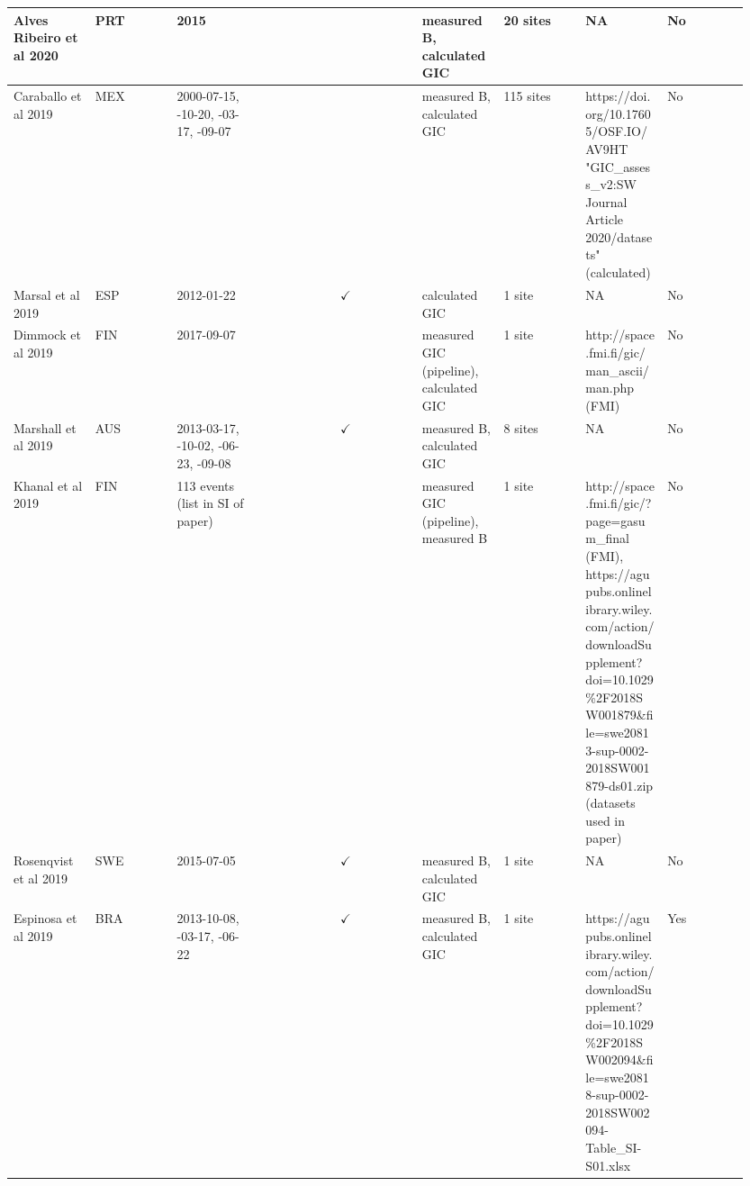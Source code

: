 \begin{longtable}{p{0.106\linewidth}p{0.106\linewidth}p{0.106\linewidth}p{0.106\linewidth}p{0.106\linewidth}p{0.106\linewidth}p{0.106\linewidth}p{0.106\linewidth}p{0.106\linewidth}}
Alves Ribeiro et al 2020 & PRT & 2015 &  &  & measured B, \newline calculated GIC & 20 sites & NA & No \\ \hline
Caraballo et al 2019 & MEX & 2000-07-15, \newline 2003-10-20, \newline 2015-03-17, \newline 2017-09-07 &  &  & measured B, \newline calculated GIC & 115 sites & https://doi.org/10.17605/OSF.IO/AV9HT "GIC\_assess\_v2:SW Journal Article 2020/datasets" (calculated) & No \\ \hline
Marsal et al 2019 & ESP & 2012-01-22 &  & $\checkmark$ & calculated GIC & 1 site & NA & No \\ \hline
Dimmock et al 2019 & FIN & 2017-09-07 &  &  & measured GIC (pipeline), \newline calculated GIC & 1 site & http://space.fmi.fi/gic/man\_ascii/man.php (FMI) & No \\ \hline
Marshall et al 2019 & AUS & 2013-03-17, \newline 2013-10-02, \newline 2015-06-23, \newline 2017-09-08 &  & $\checkmark$ & measured B, \newline calculated GIC & 8 sites & NA & No \\ \hline
Khanal et al 2019 & FIN & 113 events (list in SI of paper) &  &  & measured GIC (pipeline), \newline measured B & 1 site & http://space.fmi.fi/gic/?page=gasum\_final (FMI), \newline https://agupubs.onlinelibrary.wiley.com/action/downloadSupplement?doi=10.1029\%2F2018SW001879\&file=swe20813-sup-0002-2018SW001879-ds01.zip (datasets used in paper) & No \\ \hline
Rosenqvist et al 2019 & SWE & 2015-07-05 &  & $\checkmark$ & measured B, \newline calculated GIC & 1 site & NA & No \\ \hline
Espinosa et al 2019 & BRA & 2013-10-08, \newline 2015-03-17, \newline 2015-06-22 &  & $\checkmark$ & measured B, \newline calculated GIC & 1 site & https://agupubs.onlinelibrary.wiley.com/action/downloadSupplement?doi=10.1029\%2F2018SW002094\&file=swe20818-sup-0002-2018SW002094-Table\_SI-S01.xlsx & Yes \\ \hline

\end{longtable}
